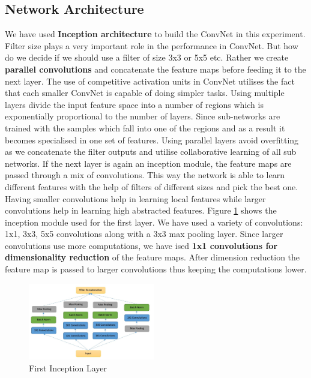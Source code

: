 \documentclass[fleqn,10pt]{SelfArx} %
\begin{document}
\subsection{Network Architecture}
We have used \textbf{Inception architecture} to build the ConvNet in this experiment. Filter size plays a very important role in the performance in ConvNet. But how do we decide if we should use a filter of size 3x3 or 5x5 etc. Rather we create \textbf{parallel convolutions} and concatenate the feature maps before feeding it to the next layer. The use of competitive activation units in ConvNet utilises the fact that each smaller ConvNet is capable of doing simpler tasks. Using multiple layers divide the input feature space into a number of regions which is exponentially proportional to the number of layers. Since sub-networks are trained with the samples which fall into one of the regions and as a result it becomes specialised in one set of features. Using parallel layers avoid overfitting as we concatenate the filter outputs and utilise collaborative learning of all sub networks.
\newline
If the next layer is again an inception module, the feature maps are passed through a mix of convolutions. This way the network is able to learn different features with the help of filters of different sizes and pick the best one. Having smaller convolutions help in learning local features while larger convolutions help in learning high abstracted features.
\newline
Figure \ref{fig:first_layer} shows the inception module used for the first layer. We have used a variety of convolutions: 1x1, 3x3, 5x5 convolutions along with a 3x3 max pooling layer. Since larger convolutions use more computations, we have ised \textbf{1x1 convolutions for dimensionality reduction} of the feature maps. After dimension reduction the feature map is passed to larger convolutions thus keeping the computations lower.

\begin{figure}[ht]\centering
\includegraphics[width=0.49\textwidth]{first_layer}
\caption{First Inception Layer}
\label{fig:first_layer}
\end{figure}
\end{document}
